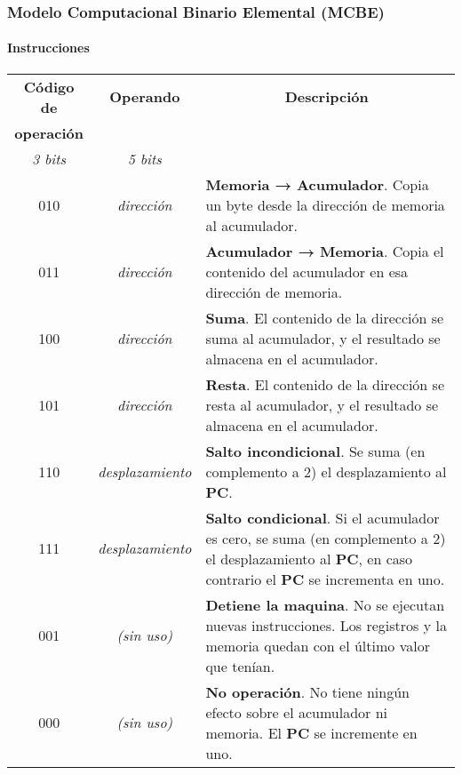 \documentclass[11pt,a4paper,spanish]{beamer}
\begin{document}
\begin{frame}
    \frametitle{Modelo Computacional Binario Elemental (MCBE)}
    \framesubtitle{Instrucciones}

\tiny
\begin{tabularx}{\textwidth}{c|c|X}

    \textbf{Código de} & \textbf{Operando} &
    \multicolumn{1}{c}{\textbf{Descripción}} \\

    \textbf{operación} & & \\

    \emph{3 bits} & \emph{5 bits} & \\
    \hline
    \hline

    010 & \emph{dirección} & \textbf{Memoria → Acumulador}. Copia
    un byte desde la dirección de memoria al acumulador. \\ \hline

    011 & \emph{dirección} & \textbf{Acumulador → Memoria}. Copia
    el contenido del acumulador en esa dirección de memoria. \\ \hline

    100 & \emph{dirección} & \textbf{Suma}. El contenido de la
    dirección se suma al acumulador, y el resultado se almacena en el
    acumulador. \\ \hline

    101 & \emph{dirección} & \textbf{Resta}. El contenido de la
    dirección se resta al acumulador, y el resultado se almacena en el
    acumulador. \\ \hline

    110 & \emph{desplazamiento} & \textbf{Salto incondicional}. Se
    suma (en complemento a 2) el desplazamiento al \textbf{PC}. \\ \hline

    111 & \emph{desplazamiento} & \textbf{Salto condicional}. Si
    el acumulador es cero, se suma (en complemento a 2) el desplazamiento al
    \textbf{PC}, en caso contrario el \textbf{PC} se incrementa en uno. \\
    \hline

    001 & \emph{(sin uso)} & \textbf{Detiene la maquina}. No se
    ejecutan nuevas instrucciones. Los registros y la memoria quedan con el
    último valor que tenían. \\ \hline

    000 & \emph{(sin uso)} & \textbf{No operación}. No tiene
    ningún efecto sobre el acumulador ni memoria. El \textbf{PC} se incremente
    en uno. \\

\end{tabularx}
\end{frame}
\end{document}
